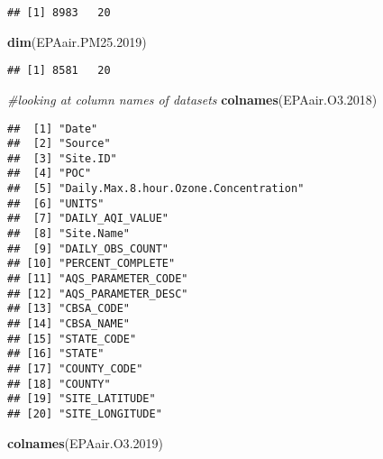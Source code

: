 \documentclass[]{article}
\newenvironment{Shaded}{\begin{snugshade}}{\end{snugshade}}
\newcommand{\CommentTok}[1]{\textcolor[rgb]{0.56,0.35,0.01}{\textit{#1}}}
\newcommand{\FloatTok}[1]{\textcolor[rgb]{0.00,0.00,0.81}{#1}}
\newcommand{\KeywordTok}[1]{\textcolor[rgb]{0.13,0.29,0.53}{\textbf{#1}}}
\newcommand{\NormalTok}[1]{#1}
\begin{document}
\begin{verbatim}
## [1] 8983   20
\end{verbatim}

\begin{Shaded}
\begin{Highlighting}[]
\KeywordTok{dim}\NormalTok{(EPAair.PM25}\FloatTok{.2019}\NormalTok{)}
\end{Highlighting}
\end{Shaded}

\begin{verbatim}
## [1] 8581   20
\end{verbatim}

\begin{Shaded}
\begin{Highlighting}[]
\CommentTok{#looking at column names of datasets}
\KeywordTok{colnames}\NormalTok{(EPAair.O3}\FloatTok{.2018}\NormalTok{)}
\end{Highlighting}
\end{Shaded}

\begin{verbatim}
##  [1] "Date"                                
##  [2] "Source"                              
##  [3] "Site.ID"                             
##  [4] "POC"                                 
##  [5] "Daily.Max.8.hour.Ozone.Concentration"
##  [6] "UNITS"                               
##  [7] "DAILY_AQI_VALUE"                     
##  [8] "Site.Name"                           
##  [9] "DAILY_OBS_COUNT"                     
## [10] "PERCENT_COMPLETE"                    
## [11] "AQS_PARAMETER_CODE"                  
## [12] "AQS_PARAMETER_DESC"                  
## [13] "CBSA_CODE"                           
## [14] "CBSA_NAME"                           
## [15] "STATE_CODE"                          
## [16] "STATE"                               
## [17] "COUNTY_CODE"                         
## [18] "COUNTY"                              
## [19] "SITE_LATITUDE"                       
## [20] "SITE_LONGITUDE"
\end{verbatim}

\begin{Shaded}
\begin{Highlighting}[]
\KeywordTok{colnames}\NormalTok{(EPAair.O3}\FloatTok{.2019}\NormalTok{)}
\end{Highlighting}
\end{Shaded}
\end{document}
